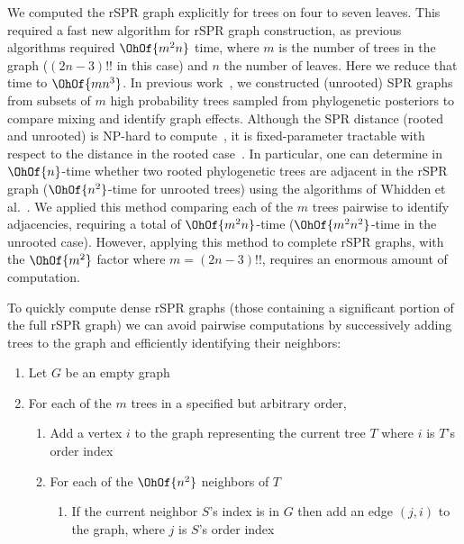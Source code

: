 \documentclass[11pt,onecolumn,conference]{IEEEtran}
\begin{document}
We computed the rSPR graph explicitly for trees on four to seven leaves.
This required a fast new algorithm for rSPR graph construction, as previous algorithms required $\OhOf{m^2 n}$ time, where $m$ is the number of trees in the graph ($(2n-3)!!$ in this case) and $n$ the number of leaves.
Here we reduce that time to $\OhOf{mn^3}$.
In previous work~\cite{Whidden2015-yi}, we constructed (unrooted) SPR graphs from subsets of $m$ high probability trees sampled from phylogenetic posteriors to compare mixing and identify graph effects.
Although the SPR distance (rooted and unrooted) is NP-hard to compute~\cite{bordewich05,hickey2008sdc}, it is fixed-parameter tractable with respect to the distance in the rooted case~\cite{bordewich05}.
In particular, one can determine in $\OhOf{n}$-time whether two rooted phylogenetic trees are adjacent in the rSPR graph ($\OhOf{n^2}$-time for unrooted trees) using the algorithms of Whidden et al.~\cite{whidden2009unifying,whidden2010fast, whidden2013hybridization,Whidden2015-yi}.
We applied this method comparing each of the $m$ trees pairwise to identify adjacencies, requiring a total of $\OhOf{m^2n}$-time ($\OhOf{m^2 n^2}$-time in the unrooted case).
However, applying this method to complete rSPR graphs, with the $\OhOf{m^2}$ factor where $m = (2n-3)!!$, requires an enormous amount of computation.

To quickly compute dense rSPR graphs (those containing a significant portion of the full rSPR graph) we can avoid pairwise computations by successively adding trees to the graph and efficiently identifying their neighbors:
\begin{enumerate}[label={\arabic*}.]
	\item Let $G$ be an empty graph
	\item For each of the $m$ trees in a specified but arbitrary order,
		\begin{enumerate}
			\item Add a vertex $i$ to the graph representing the current tree $T$ where $i$ is $T$'s order index
			\item For each of the $\OhOf{n^2}$ neighbors of $T$
				\begin{enumerate}
					\item If the current neighbor $S$'s index is in $G$ then add an edge $(j,i)$ to the graph, where $j$ is $S$'s order index
				\end{enumerate}
		\end{enumerate}
\end{enumerate}
\end{document}

